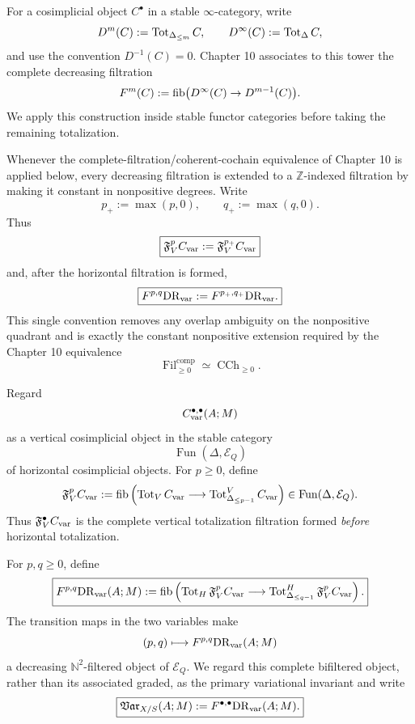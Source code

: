 For a cosimplicial object \(C^\bullet\) in a stable \(\infty\)-category, write
\[
    D^m(C):=\operatorname{Tot}_{\Delta_{\le m}}C,
    \qquad
    D^\infty(C):=\operatorname{Tot}_\Delta C,
\]
and use the convention \(D^{-1}(C)=0\). Chapter 10 associates to this tower the complete decreasing filtration
\[
    F^m(C):=\operatorname{fib}\bigl(D^\infty(C)\to D^{m-1}(C)\bigr).
\]
We apply this construction inside stable functor categories before taking the remaining totalization.

\begin{convention}
\label{conv:var-nonpositive-filtration}
Whenever the complete-filtration/coherent-cochain equivalence of Chapter 10 is applied below, every decreasing filtration is extended to a \(\mathbb Z\)-indexed filtration by making it constant in nonpositive degrees. Write
\[
    p_+:=\max(p,0),
    \qquad
    q_+:=\max(q,0).
\]
Thus
\[
    \boxed{
    \mathfrak F_V^pC_{\mathrm{var}}
    :=
    \mathfrak F_V^{p_+}C_{\mathrm{var}}
    }
\]
and, after the horizontal filtration is formed,
\[
    \boxed{
    F^{p,q}\mathrm{DR}_{\mathrm{var}}
    :=
    F^{p_+,q_+}\mathrm{DR}_{\mathrm{var}}.
    }
\]
This single convention removes any overlap ambiguity on the nonpositive quadrant and is exactly the constant nonpositive extension required by the Chapter 10 equivalence
\[
    \operatorname{Fil}^{\mathrm{comp}}_{\ge0}
    \simeq
    \operatorname{CCh}_{\ge0}.
\]
\end{convention}

\begin{definition}
\label{def:var-vertical-filtered-cosimplicial}
Regard
\[
    C_{\mathrm{var}}^{\bullet,\bullet}(A;M)
\]
as a vertical cosimplicial object in the stable category
\[
    \operatorname{Fun}(\Delta,\mathcal E_Q)
\]
of horizontal cosimplicial objects. For \(p\ge0\), define
\[
    \mathfrak F_V^pC_{\mathrm{var}}
    :=
    \operatorname{fib}\left(
      \operatorname{Tot}_VC_{\mathrm{var}}
      \longrightarrow
      \operatorname{Tot}^V_{\Delta_{\le p-1}}C_{\mathrm{var}}
    \right)
    \in\operatorname{Fun}(\Delta,\mathcal E_Q).
\]
Thus \(\mathfrak F_V^\bullet C_{\mathrm{var}}\) is the complete vertical totalization filtration formed \emph{before} horizontal totalization.
\end{definition}

\begin{definition}
\label{def:var-complete-bifiltration}
For \(p,q\ge0\), define
\[
    \boxed{
    F^{p,q}\mathrm{DR}_{\mathrm{var}}(A;M)
    :=
    \operatorname{fib}\left(
       \operatorname{Tot}_H\mathfrak F_V^pC_{\mathrm{var}}
       \longrightarrow
       \operatorname{Tot}^H_{\Delta_{\le q-1}}\mathfrak F_V^pC_{\mathrm{var}}
    \right).
    }
\]
The transition maps in the two variables make
\[
    (p,q)\longmapsto F^{p,q}\mathrm{DR}_{\mathrm{var}}(A;M)
\]
a decreasing \(\mathbb N^2\)-filtered object of \(\mathcal E_Q\). We regard this complete bifiltered object, rather than its associated graded, as the primary variational invariant and write
\[
    \boxed{
    \mathfrak{Var}_{X/S}(A;M)
    :=
    F^{\bullet,\bullet}\mathrm{DR}_{\mathrm{var}}(A;M).
    }
\]
\end{definition}

